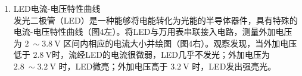 \documentclass[a4paper]{article}
\begin{document}
\begin{enumerate}[label=\chinese*.,left=0pt]
\begin{enumerate}[label=\arabic*.,left=0pt]
\begin{minipage}[t]{0.48\linewidth}
\begin{table}[H]
{\begin{tabular}{cccccc}
            \end{tabular}
            }
        \end{table}
        \end{minipage}
        \hfill
        \begin{minipage}[t]{0.48\linewidth}
        \begin{table}[H]
            \caption{非反相放大电路增益}
            \centering
        \end{table}
        \end{minipage}
        \\[3mm]

        可以看到，电路的实际增益与理论增益基本一致，当选取电阻阻值较小时误差最大，这可能是运算放大器内部存在的阻抗所导致的。

        \item LED电流-电压特性曲线
        \\[1mm]
        发光二极管（LED）是一种能够将电能转化为光能的半导体器件，具有特殊的电流-电压特性曲线（图4左）。将LED与万用表串联接入电路，测量外加电压为 $\qty{2}{} \sim \qty{3.8}{\V}$ 区间内相应的电流大小并绘图（图4右）。观察发现，当外加电压低于 $\qty{2.8}{\V} $时，流经LED的电流很微弱，LED几乎不发光；外加电压为$\qty{2.8}{} \sim \qty{3.2}{\V}$ 时，LED微亮；外加电压高于 $\qty{3.2}{\V}$ 时，LED发出强亮光。


\end{enumerate}
\end{enumerate}
\end{document}
